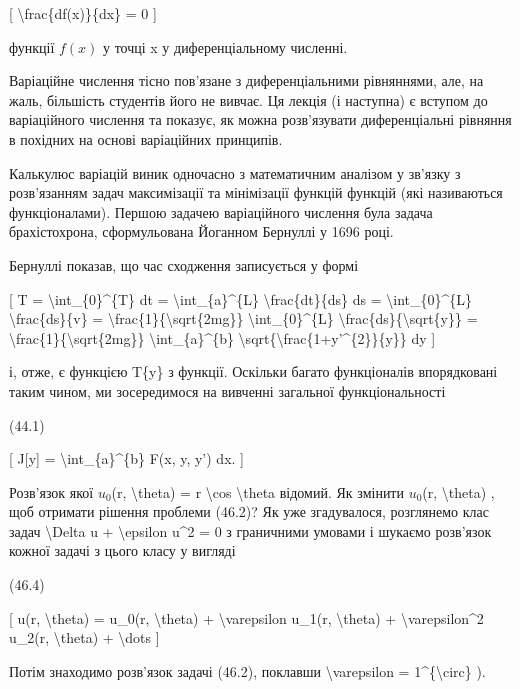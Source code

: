 \documentclass[
]{article}
\begin{document}
{{[} \textbackslash frac\{df(x)\}\{dx\} = 0 {]}

функції \(f(x)\) у точці x у диференціальному численні.

Варіаційне числення тісно пов'язане з диференціальними рівняннями, але,
на жаль, більшість студентів його не вивчає. Ця лекція (і наступна) є
вступом до варіаційного числення та показує, як можна розв'язувати
диференціальні рівняння в похідних на основі варіаційних принципів.

Калькулюс варіацій виник одночасно з математичним аналізом у зв'язку з
розв'язанням задач максимізації та мінімізації функцій функцій (які
називаються функціоналами). Першою задачею варіаційного числення була
задача брахістохрона, сформульована Йоганном Бернуллі у 1696 році.

Бернуллі показав, що час сходження записується у формі

{[} T = \textbackslash int\_\{0\}\^{}\{T\} dt =
\textbackslash int\_\{a\}\^{}\{L\} \textbackslash frac\{dt\}\{ds\} ds =
\textbackslash int\_\{0\}\^{}\{L\} \textbackslash frac\{ds\}\{v\} =
\textbackslash frac\{1\}\{\textbackslash sqrt\{2mg\}\}
\textbackslash int\_\{0\}\^{}\{L\}
\textbackslash frac\{ds\}\{\textbackslash sqrt\{y\}\} =
\textbackslash frac\{1\}\{\textbackslash sqrt\{2mg\}\}
\textbackslash int\_\{a\}\^{}\{b\}
\textbackslash sqrt\{\textbackslash frac\{1+y'\^{}\{2\}\}\{y\}\} dy {]}

і, отже, є функцією T\{y\} з функції. Оскільки багато функціоналів
впорядковані таким чином, ми зосередимося на вивченні загальної
функціональності

(44.1)

{[} J{[}y{]} = \textbackslash int\_\{a\}\^{}\{b\} F(x, y, y') dx. {]}

Розв'язок якої \(u_0\)(r, \textbackslash theta) = r \textbackslash cos
\textbackslash theta відомий. Як змінити \(u_0\)(r,
\textbackslash theta) , щоб отримати рішення проблеми (46.2)? Як уже
згадувалося, розглянемо клас задач \textbackslash Delta u +
\textbackslash epsilon u\^{}2 = 0 з граничними умовами і шукаємо
розв'язок кожної задачі з цього класу у вигляді

(46.4)

{[} u(r, \textbackslash theta) = u\_0(r, \textbackslash theta) +
\textbackslash varepsilon u\_1(r, \textbackslash theta) +
\textbackslash varepsilon\^{}2 u\_2(r, \textbackslash theta) +
\textbackslash dots {]}

Потім знаходимо розв'язок задачі (46.2), поклавши
\textbackslash varepsilon = 1\^{}\{\textbackslash circ\} ).

}
\end{document}
